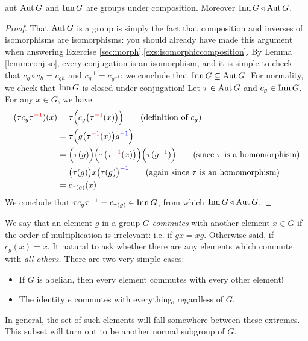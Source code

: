 \begin{thm}{}{aut}
$\operatorname{Aut} G$ and $\operatorname{Inn} G$ are groups under composition. Moreover $\operatorname{Inn} G\triangleleft\operatorname{Aut} G$.
\end{thm}

\begin{proof}
That $\operatorname{Aut} G$ is a group is simply the fact that composition and inverses of isomorphisms are isomorphisms: you should already have made this argument when answering Exercise \ref*{sec:morph}.\ref{exs:isomorphiccomposition}. By Lemma \ref{lemm:conjiso}, every conjugation is an isomorphism, and it is simple to check that $c_g\circ c_h=c_{gh}$ and $c_g^{-1}=c_{g^{-1}}$: we conclude that $\operatorname{Inn} G\subseteq \operatorname{Aut} G$.\smallbreak
For normality, we check that $\operatorname{Inn} G$ is closed under conjugation! Let $\tau\in\operatorname{Aut} G$ and $c_g\in\operatorname{Inn} G$. For any $x\in G$, we have\footnotemark
\begin{align*}
(\tau c_g\tau^{\textcolor{red}{-1}})(x)&=\tau\Bigl(c_g\bigl(\tau^{\textcolor{red}{-1}}(x)\bigr)\Bigr)\tag{definition of $c_g$}\\
&=\tau\Bigl(g\bigl(\tau^{\textcolor{red}{-1}}(x)\bigr)g^{\textcolor{blue}{-1}}\Bigr)\\
&=\Bigl(\tau(g)\Bigr)\Bigl(\tau\bigl(\tau^{\textcolor{red}{-1}}(x)\bigr)\Bigr)\Bigl(\tau(g^{\textcolor{blue}{-1}})\Bigr)\tag*{(since $\tau$ is a homomorphism)}\\
&=\bigl(\tau(g)\bigr)x\bigl(\tau(g)\bigr)^{\textcolor{blue}{-1}}\tag*{(again since $\tau$ is an homomorphism)}\\
&=c_{\tau(g)}(x)
\end{align*}
We conclude that $\tau c_g\tau^{-1}=c_{\tau(g)}\in \operatorname{Inn} G$, from which $\operatorname{Inn} G\triangleleft\operatorname{Aut} G$.
\end{proof}

\vspace{-2pt}


\goodbreak



We say that an element $g$ in a group $G$ \emph{commutes} with another element $x\in G$ if the order of multiplication is irrelevant: i.e. if $gx=xg$. Otherwise said, if $c_g(x)=x$. It natural to ask whether there are any elements which commute with \emph{all others.} There are two very simple cases:
\begin{itemize}
  \item If $G$ is abelian, then every element commutes with every other element!
  \item The identity $e$ commutes with everything, regardless of $G$.
\end{itemize}
In general, the set of such elements will fall somewhere between these extremes. This subset will turn out to be another normal subgroup of $G$.

